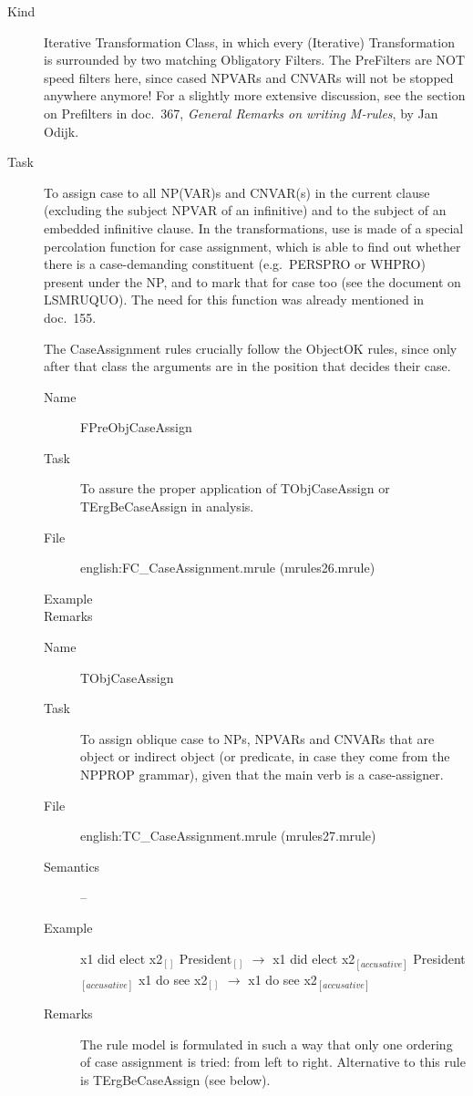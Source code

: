 \begin{description}
\item[Kind] Iterative Transformation Class, in which every (Iterative)
Transformation is surrounded by two matching Obligatory Filters. The PreFilters 
are NOT speed filters here, since cased NPVARs and CNVARs will not be stopped 
anywhere anymore! For a slightly more extensive discussion, see the section on 
Prefilters in doc.\ 367, {\em 
General Remarks on writing M-rules\/}, by Jan Odijk.
\item[Task] To assign case to all NP(VAR)s and CNVAR(s) in the current clause
(excluding the subject NPVAR of an infinitive) and to the subject of an 
embedded infinitive clause. In the transformations, use is made of a special 
percolation 
function for case assignment, which is able to find out whether there is a 
case-demanding constituent (e.g.\ PERSPRO or WHPRO) present under the NP, 
and to mark that for case too (see the document on LSMRUQUO). The need for this 
function was already mentioned in doc.\ 155.

The CaseAssignment rules crucially follow the ObjectOK rules, since only after 
that class the arguments are in the position that decides their case.

\vspace{1 cm}
\begin{description}
\item[Name] FPreObjCaseAssign
\item[Task] To assure the proper application of TObjCaseAssign or 
TErgBeCaseAssign in analysis.
\item[File] english:FC\_CaseAssignment.mrule (mrules26.mrule)
\item[Example] 
\item[Remarks]
\end{description}

\vspace{1 cm}
\begin{description}
\item[Name] TObjCaseAssign
\item[Task] To assign oblique case to NPs, NPVARs and CNVARs that are object or 
indirect object (or predicate, in case they come from the NPPROP grammar), 
given that the main verb is a case-assigner.
\item[File] english:TC\_CaseAssignment.mrule (mrules27.mrule)
\item[Semantics] -- 
\item[Example] \mbox{}
x1 did elect x2$_{[]}$ President$_{[]}$ $\rightarrow$ 
x1 did elect x2$_{[accusative]}$ President$_{[accusative]}$
x1 do see x2$_{[]}$ $\rightarrow$ x1 do see x2$_{[accusative]}$
\item[Remarks] The rule model is formulated in such a way that only one 
ordering of case assignment is tried: from left to right. Alternative to this 
rule is TErgBeCaseAssign (see below).
\end{description}


\end{description}
